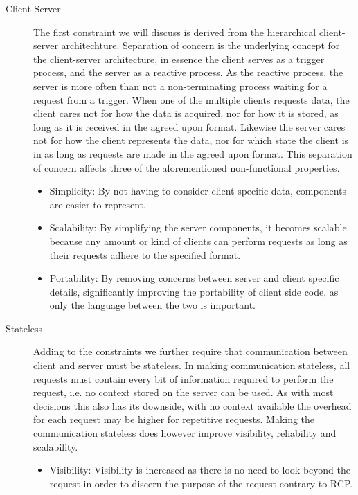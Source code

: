 \begin{description}
    \item [Client-Server] The first constraint we will discuss is derived from the hierarchical client-server architechture.
    Separation of concern is the underlying concept for the client-server architecture, in essence the client serves as a trigger process, and the server as a reactive process.
    As the reactive process, the server is more often than not a non-terminating process waiting for a request from a trigger.
    When one of the multiple clients requests data, the client cares not for how the data is acquired, nor for how it is stored, as long as it is received in the agreed upon format.
    Likewise the server cares not for how the client represents the data, nor for which state the client is in as long as requests are made in the agreed upon format.
    This separation of concern affects three of the aforementioned non-functional properties.
    \begin{itemize}
        \item Simplicity: By not having to consider client specific data, components are easier to represent.
        \item Scalability: By simplifying the server components, it becomes scalable because any amount or kind of clients can perform requests as long as their requests adhere to the specified format. 
        \item Portability: By removing concerns between server and client specific details, significantly improving the portability of client side code, as only the language between the two is important.
    \end{itemize}
    \item [Stateless] Adding to the constraints we further require that communication between client and server must be stateless.
    In making communication stateless, all requests must contain every bit of information required to perform the request, i.e. no context stored on the server can be used.
    As with most decisions this also has its downside, with no context available the overhead for each request may be higher for repetitive requests.
    Making the communication stateless does however improve visibility, reliability and scalability.
    \begin{itemize}
        \item Visibility: Visibility is increased as there is no need to look beyond the request in order to discern the purpose of the request contrary to RCP.

\end{itemize}
\end{description}
